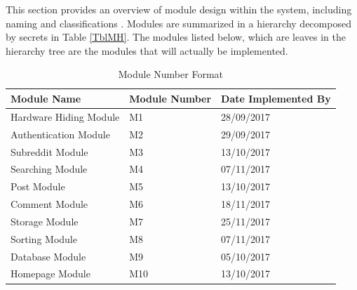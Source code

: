 \documentclass[12pt,fleqn]{article}
\begin{document}
This section provides an overview of module design within the system, including naming and classifications . Modules are summarized
in a hierarchy decomposed by secrets in Table \ref{TblMH}. The modules listed
below, which are leaves in the hierarchy tree are the modules that will
actually be implemented.

\begin{table}[!htbp]
	\begin{tabular}{lll}
		\toprule
		Module Name & Module Number & Date Implemented By \\
		\midrule
		Hardware Hiding Module & M1 & 28/09/2017\\
		\midrule
		Authentication Module & M2 & 29/09/2017 \\
		\midrule
		Subreddit Module & M3 & 13/10/2017\\
		\midrule
		Searching Module & M4 & 07/11/2017\\
		\midrule
		Post Module & M5 & 13/10/2017\\
		\midrule
		Comment Module & M6 & 18/11/2017\\
		\midrule
		Storage Module & M7 & 25/11/2017\\
		\midrule
		Sorting Module & M8 & 07/11/2017\\
		\midrule
		Database Module & M9 & 05/10/2017\\
		\midrule
		Homepage Module & M10 & 13/10/2017\\
		\bottomrule
	\end{tabular}
	\caption{Module Number Format}
	\makeatletter
	\def\rulecolor#1#{\CT@arc{#1}}
	\def\CT@arc#1#2{%
		\ifdim\baselineskip=\z@\noalign\fi
		{\gdef\CT@arc@{\color#1{#2}}}}
	\let\CT@arc@\relax
	\makeatother
	\label{Table 1}
\end{table}

\vspace{5mm}
\end{document}
